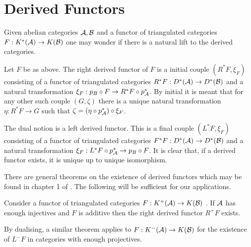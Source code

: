 \section{Derived Functors}
Given abelian categories $\AA, \mathcal{B}$ and a functor of triangulated categories $F:K^*(\AA)\to K(\mathcal{B})$ one may wonder if there is a natural lift to the derived categories.
\begin{definition}
 Let $F$ be as above. The right derived functor of $F$ is a initial couple $(R^*F,\xi_F)$ consisting of a functor of triangulated categories $R^*F:D^*(\AA) \to D^*(\mathcal{B})$ and a natural transformation $\xi_F:p_B\circ F \to R^*F \circ p_\AA^*$.
 By initial it is meant that for any other such couple $(G,\zeta)$ there is a unique natural transformation $\eta: R^*F\to G$ such that $\zeta = (\eta \circ p_\AA^*)\circ \xi_{F}$.
\end{definition}
The dual notion is a left derived functor. This is a final couple $(L^*F,\xi_F)$ consisting of a functor of triangulated categories $F^*F:D^*(\AA) \to D^*(\mathcal{B})$ and a natural transformation $\xi_F:  L^*F \circ p_\AA^* \to p_B\circ F$.
It is clear that, if a derived functor exists, it is unique up to unique isomorphism.

There are general theorems on the existence of derived functors which may be found in chapter 1 of \cite{dimca2004sheaves}.
The following will be sufficient for our applications.
\begin{theorem}\label{thm: InjectivesAllowDerivedFunctor}
 Consider a functor of triangulated categories $F:K^+(\AA)\to K(\mathcal{B})$ .
 If $\AA$ has enough injectives and $F$ is additive then the right derived functor $R^+F$ exists.
\end{theorem}
By dualising, a similar theorem applies to $F:K^-(\AA)\to K(\mathcal{B})$ for the existence of $L^- F$ in categories with enough projectives.

